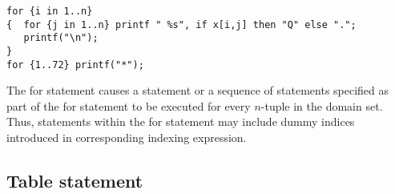 \documentclass[10pt]{article}
\begin{document}
\newpage

\begin{verbatim}
for {i in 1..n}
{  for {j in 1..n} printf " %s", if x[i,j] then "Q" else ".";
   printf("\n");
}
for {1..72} printf("*");
\end{verbatim}

The for statement causes a statement or a sequence of statements
specified as part of the for statement to be executed for every
$n$-tuple in the domain set. Thus, statements within the for statement
may include dummy indices introduced in corresponding indexing
expression.

\subsection{Table statement}

\medskip


\setlength{\leftmargini}{60pt}
\end{document}
